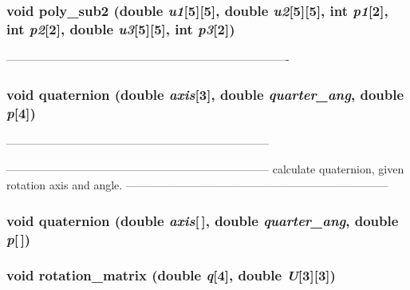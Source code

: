\subsubsection{\setlength{\rightskip}{0pt plus 5cm}void poly\_\-sub2 (double {\em u1}[5][5], double {\em u2}[5][5], int {\em p1}[2], int {\em p2}[2], double {\em u3}[5][5], int {\em p3}[2])}\label{PTripepClosure_8h_eefb1297cbb70b777cd9fba016c3b72e}


---------------------------------------------------------------------------- 

\subsubsection{\setlength{\rightskip}{0pt plus 5cm}void quaternion (double {\em axis}[3], double {\em quarter\_\-ang}, double {\em p}[4])}\label{PTripepClosure_8h_e9356d7314d0018cc461594f5c340eec}


----------------------------------------------------------------------- 



----------------------------------------------------------------------- calculate quaternion, given rotation axis and angle. ----------------------------------------------------------------------- 
\subsubsection{\setlength{\rightskip}{0pt plus 5cm}void quaternion (double {\em axis}[$\,$], double {\em quarter\_\-ang}, double {\em p}[$\,$])}\label{PTripepClosure_8h_020855c4fb206a413e0322064b26a22a}


\subsubsection{\setlength{\rightskip}{0pt plus 5cm}void rotation\_\-matrix (double {\em q}[4], double {\em U}[3][3])}\label{PTripepClosure_8h_b4dcc0bfdb83aec6776142dc80418005}


